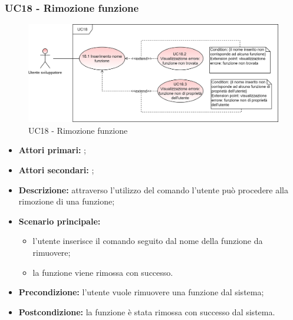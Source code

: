 \subsubsection{UC18 - Rimozione funzione}
\begin{figure}[h]
	\centering
	\includegraphics[scale=\ucs]{./res/img/UC18.png}
	\caption {UC18 - Rimozione funzione}
\end{figure}
\begin{itemize}
	\item \textbf{Attori primari:} \us{};
	\item \textbf{Attori secondari:} \re{};
	\item \textbf{Descrizione:} attraverso l’utilizzo del comando \delete{} l’utente può procedere alla rimozione di una funzione;  
	\item \textbf{Scenario principale:} 
	\begin{itemize}
		\item l’utente inserisce il comando \delete{} seguito dal nome della funzione da rimuovere; 
		\item la funzione viene rimossa con successo. 
	\end{itemize}
	\item \textbf{Precondizione:} l’utente vuole rimuovere una funzione dal sistema;  
	\item \textbf{Postcondizione:} la funzione è stata rimossa con successo dal sistema.
\end{itemize}